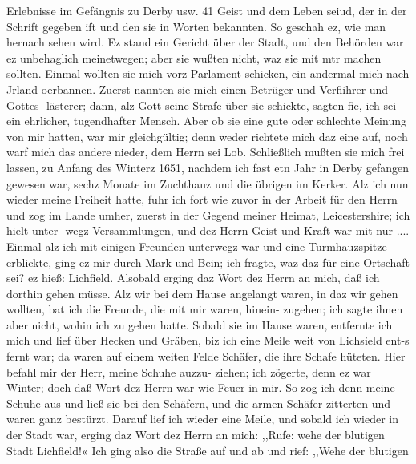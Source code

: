 Erlebnisse im Gefängnis zu Derby usw. 41
Geist und dem Leben seiud, der in der Schrift gegeben ift und
den sie in Worten bekannten. So geschah ez, wie man hernach
sehen wird.
Ez stand ein Gericht über der Stadt, und den Behörden war
ez unbehaglich meinetwegen; aber sie wußten nicht, waz sie mit
mtr machen sollten. Einmal wollten sie mich vorz Parlament
schicken, ein andermal mich nach Jrland oerbannen. Zuerst
nannten sie mich einen Betrüger und Verfiihrer und Gottes-
lästerer; dann, alz Gott seine Strafe über sie schickte, sagten fie,
ich sei ein ehrlicher, tugendhafter Mensch. Aber ob sie eine gute
oder schlechte Meinung von mir hatten, war mir gleichgültig;
denn weder richtete mich daz eine auf, noch warf mich das andere
nieder, dem Herrn sei Lob. Schließlich mußten sie mich frei
lassen, zu Anfang des Winterz 1651, nachdem ich fast etn Jahr
in Derby gefangen gewesen war, sechz Monate im Zuchthauz
und die übrigen im Kerker.
Alz ich nun wieder meine Freiheit hatte, fuhr ich fort wie
zuvor in der Arbeit für den Herrn und zog im Lande umher,
zuerst in der Gegend meiner Heimat, Leicestershire; ich hielt unter-
wegz Versammlungen, und dez Herrn Geist und Kraft war mit
nur ....
Einmal alz ich mit einigen Freunden unterwegz war und
eine Turmhauzspitze erblickte, ging ez mir durch Mark und Bein;
ich fragte, waz daz für eine Ortschaft sei? ez hieß: Lichfield.
Alsobald erging daz Wort dez Herrn an mich, daß ich dorthin
gehen müsse. Alz wir bei dem Hause angelangt waren, in daz
wir gehen wollten, bat ich die Freunde, die mit mir waren, hinein-
zugehen; ich sagte ihnen aber nicht, wohin ich zu gehen hatte.
Sobald sie im Hause waren, entfernte ich mich und lief über
Hecken und Gräben, biz ich eine Meile weit von Lichsield ent-s
fernt war; da waren auf einem weiten Felde Schäfer, die ihre
Schafe hüteten. Hier befahl mir der Herr, meine Schuhe auzzu-
ziehen; ich zögerte, denn ez war Winter; doch daß Wort dez
Herrn war wie Feuer in mir. So zog ich denn meine Schuhe
aus und ließ sie bei den Schäfern, und die armen Schäfer zitterten
und waren ganz bestürzt. Darauf lief ich wieder eine Meile,
und sobald ich wieder in der Stadt war, erging daz Wort dez
Herrn an mich: ,,Rufe: wehe der blutigen Stadt Lichfield!« Ich
ging also die Straße auf und ab und rief: ,,Wehe der blutigen


